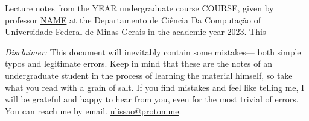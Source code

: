 Lecture notes from the YEAR undergraduate course COURSE, given by professor
\href{LINK}{NAME} at the Departamento de Ciência Da Computação of Universidade Federal de Minas Gerais in the academic year 2023. This

\textit{Disclaimer:} This document will inevitably contain some mistakes— both
simple typos and legitimate errors. Keep in mind that these are the notes of an
undergraduate student in the process of learning the material himself, so take
what you read with a grain of salt. If you find mistakes and feel like telling
me, I will be grateful and happy to hear from you, even for the most trivial of
errors. You can reach me by email.
\href{mailto:ulissao@proton.me}{ulissao@proton.me}.